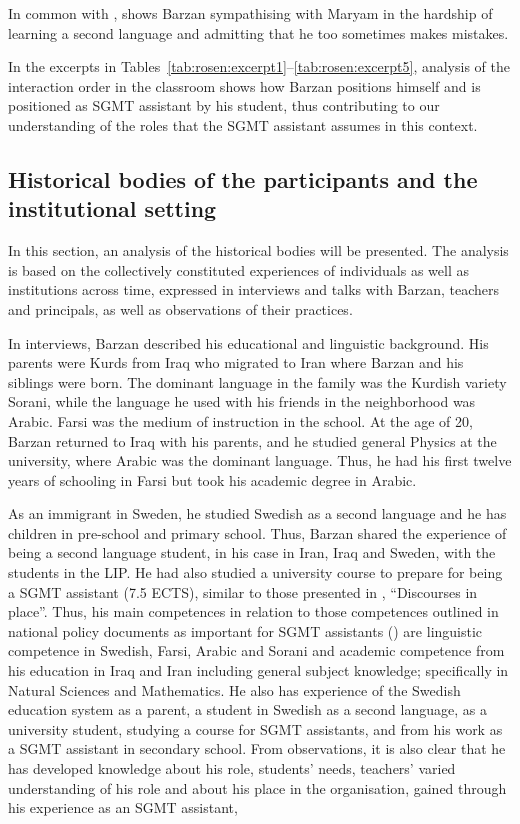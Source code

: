\documentclass[output=paper]{langscibook}
\begin{document}
In common with ,  shows Barzan sympathising with Maryam in the hardship of learning a second language and admitting that he too sometimes makes mistakes.  

In the excerpts in Tables~\ref{tab:rosen:excerpt1}--\ref{tab:rosen:excerpt5}, analysis of the interaction order in the classroom shows how Barzan positions himself and is positioned as SGMT assistant by his student, thus contributing to our understanding of the roles that the SGMT assistant assumes in this context.

\subsection{Historical bodies of the participants and the institutional setting}

In this section, an analysis of the historical bodies will be presented. The analysis is based on the collectively constituted experiences of individuals as well as institutions across time, expressed in interviews and talks with Barzan, teachers and principals, as well as observations of their practices.  

In interviews, Barzan described his educational and linguistic background. His parents were Kurds from Iraq who migrated to Iran where Barzan and his siblings were born. The dominant language in the family was the Kurdish variety Sorani, while the language he used with his friends in the neighborhood was Arabic. Farsi was the medium of instruction in the school. At the age of 20, Barzan returned to Iraq with his parents, and he studied general Physics at the university, where Arabic was the dominant language. Thus, he had his first twelve years of schooling in Farsi but took his academic degree in Arabic. 

As an immigrant in Sweden, he studied Swedish as a second language and he has children in pre-school and primary school. Thus, Barzan shared the experience of being a second language student, in his case in Iran, Iraq and Sweden, with the students in the LIP. He had also studied a university course to prepare for being a SGMT assistant (7.5 ECTS), similar to those presented in , “Discourses in place”. Thus, his main competences in relation to those competences outlined in national policy documents as important for SGMT assistants (\citealt{Swedish_national_agency_of_education2015}) are linguistic competence in Swedish, Farsi, Arabic and Sorani and academic competence from his education in Iraq and Iran including general subject knowledge; specifically in Natural Sciences and Mathematics. He also has experience of the Swedish education system as a parent, a student in Swedish as a second language, as a university student, studying a course for SGMT assistants, and from his work as a SGMT assistant in secondary school. From observations, it is also clear that he has developed knowledge about his role, students' needs, teachers’ varied understanding of his role and about his place in the organisation, gained through his experience as an SGMT assistant,
\end{document}
